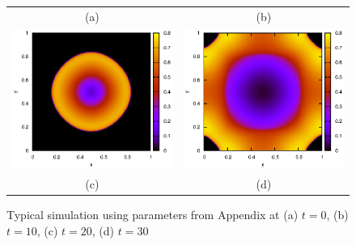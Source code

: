 \documentclass{llncs}
\begin{document}
\begin{figure}[h!tb]
\begin{center}
\begin{tabular}{c c}
        (a) & (b) \\
        \includegraphics[scale = 0.5]{typicalSim-t20.eps}&
        \includegraphics[scale = 0.5]{typicalSim-t30.eps}\\
        (c) & (d) \\
      \end{tabular}
      \caption{Typical simulation using parameters from Appendix at (a) $t = 0$, (b) $t = 10$, (c) $t = 20$, (d) $t = 30$}
      \label{fig:typical_simulation_results}
      \end{center}
    \end{figure}
\end{document}
